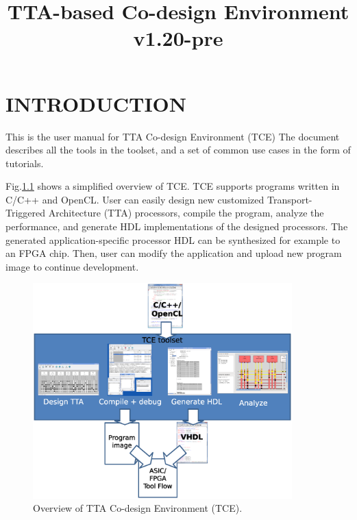 \documentclass[twoside]{tceusermanual}
\begin{document}
\title{TTA-based Co-design Environment v1.20-pre}
\maketitle

\tableofcontents

\chapter{INTRODUCTION}

This is the user manual for TTA Co-design Environment (TCE)
\cite{tcewww}
The document describes all the tools in the toolset, and a set of common use
cases in the form of tutorials.

Fig.\ref{fig:tce_overview} shows a simplified overview of TCE. TCE supports
programs written in C/C++ and OpenCL. User can easily design new customized
Transport-Triggered Architecture (TTA) processors, compile the program,
analyze the performance, and generate HDL implementations of the designed
processors. The generated application-specific processor HDL can be
synthesized for example to an FPGA chip. Then, user can modify the
application and upload new program image to continue development.

\begin{figure}
  \begin{center}
    \includegraphics[width=10cm]{eps/tce_overview}
    \caption{Overview of TTA Co-design Environment (TCE).}
    \label{fig:tce_overview}
  \end{center}
\end{figure}
\end{document}
